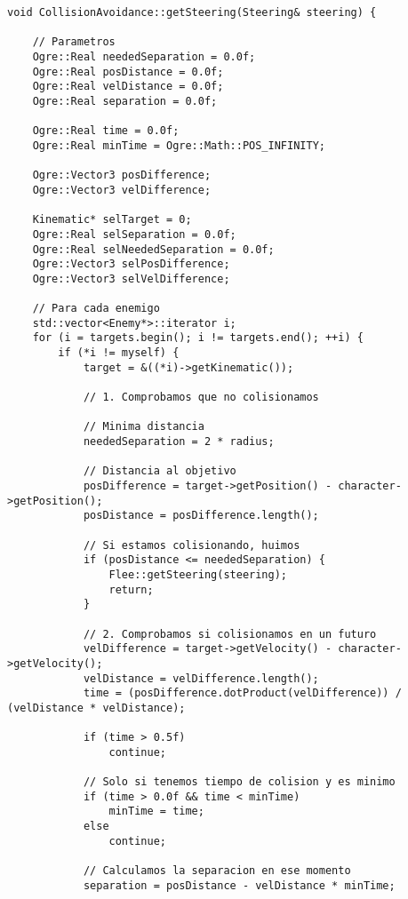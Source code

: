 \begin{lstlisting}[style=C++]
void CollisionAvoidance::getSteering(Steering& steering) {
    
    // Parametros
    Ogre::Real neededSeparation = 0.0f;
    Ogre::Real posDistance = 0.0f;
    Ogre::Real velDistance = 0.0f;
    Ogre::Real separation = 0.0f;
    
    Ogre::Real time = 0.0f;
    Ogre::Real minTime = Ogre::Math::POS_INFINITY;
    
    Ogre::Vector3 posDifference;
    Ogre::Vector3 velDifference;
    
    Kinematic* selTarget = 0;
    Ogre::Real selSeparation = 0.0f;
    Ogre::Real selNeededSeparation = 0.0f;
    Ogre::Vector3 selPosDifference;
    Ogre::Vector3 selVelDifference;
    
    // Para cada enemigo
    std::vector<Enemy*>::iterator i;
    for (i = targets.begin(); i != targets.end(); ++i) {
        if (*i != myself) {
            target = &((*i)->getKinematic());
            
            // 1. Comprobamos que no colisionamos
            
            // Minima distancia
            neededSeparation = 2 * radius;
            
            // Distancia al objetivo
            posDifference = target->getPosition() - character->getPosition();
            posDistance = posDifference.length();
            
            // Si estamos colisionando, huimos
            if (posDistance <= neededSeparation) {
                Flee::getSteering(steering);
                return;
            }
            
            // 2. Comprobamos si colisionamos en un futuro
            velDifference = target->getVelocity() - character->getVelocity();
            velDistance = velDifference.length();
            time = (posDifference.dotProduct(velDifference)) / (velDistance * velDistance);
            
            if (time > 0.5f)
                continue;
                
            // Solo si tenemos tiempo de colision y es minimo
            if (time > 0.0f && time < minTime)
                minTime = time;
            else
                continue;
            
            // Calculamos la separacion en ese momento
            separation = posDistance - velDistance * minTime;
            

\end{lstlisting}
